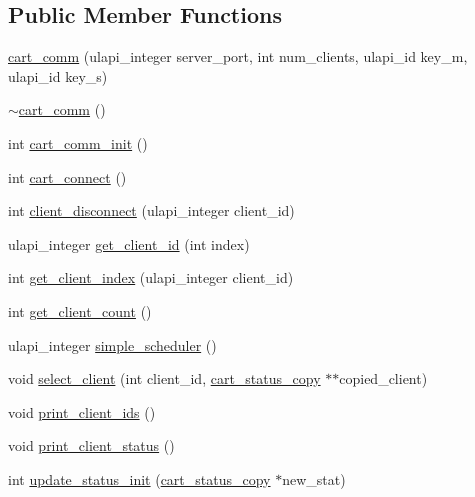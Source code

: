 \subsection*{Public Member Functions}
\begin{DoxyCompactItemize}
\item 
\mbox{\hyperlink{classcart__comm_ab336b3d84b33ef32621e083dd4006b67}{cart\+\_\+comm}} (ulapi\+\_\+integer server\+\_\+port, int num\+\_\+clients, ulapi\+\_\+id key\+\_\+m, ulapi\+\_\+id key\+\_\+s)
\item 
\mbox{\hyperlink{classcart__comm_af3b54bc88abece9901b0dc1a535c28f0}{$\sim$cart\+\_\+comm}} ()
\item 
int \mbox{\hyperlink{classcart__comm_a331ab61e71d5f94f413de56737322547}{cart\+\_\+comm\+\_\+init}} ()
\item 
int \mbox{\hyperlink{classcart__comm_a51c43bf924607212e128f75006defed8}{cart\+\_\+connect}} ()
\item 
int \mbox{\hyperlink{classcart__comm_acde9fbf68884955ccfd94a907add2396}{client\+\_\+disconnect}} (ulapi\+\_\+integer client\+\_\+id)
\item 
ulapi\+\_\+integer \mbox{\hyperlink{classcart__comm_a9f5d2a267cb9dd82603cea7656ad57fc}{get\+\_\+client\+\_\+id}} (int index)
\item 
int \mbox{\hyperlink{classcart__comm_a6dcf8cc0eedecebcd436653da2ab680d}{get\+\_\+client\+\_\+index}} (ulapi\+\_\+integer client\+\_\+id)
\item 
int \mbox{\hyperlink{classcart__comm_a33db5a17772cf87452ebdfae4547e152}{get\+\_\+client\+\_\+count}} ()
\item 
ulapi\+\_\+integer \mbox{\hyperlink{classcart__comm_acea9c1ef1278323dd0e387b34c5c8015}{simple\+\_\+scheduler}} ()
\item 
void \mbox{\hyperlink{classcart__comm_a18d4c10fb7af8cb219460461fa5967f5}{select\+\_\+client}} (int client\+\_\+id, \mbox{\hyperlink{classcart__status__copy}{cart\+\_\+status\+\_\+copy}} $\ast$$\ast$copied\+\_\+client)
\item 
void \mbox{\hyperlink{classcart__comm_a00fdba1bcb1d3e7234c83a1b2d692947}{print\+\_\+client\+\_\+ids}} ()
\item 
void \mbox{\hyperlink{classcart__comm_a46b117a719b4844c97b570229c82cbc8}{print\+\_\+client\+\_\+status}} ()
\item 
int \mbox{\hyperlink{classcart__comm_aa4aa3baa5fae85a6469ae9683a6d2cbc}{update\+\_\+status\+\_\+init}} (\mbox{\hyperlink{classcart__status__copy}{cart\+\_\+status\+\_\+copy}} $\ast$new\+\_\+stat)
$$
\end{DoxyCompactItemize}
